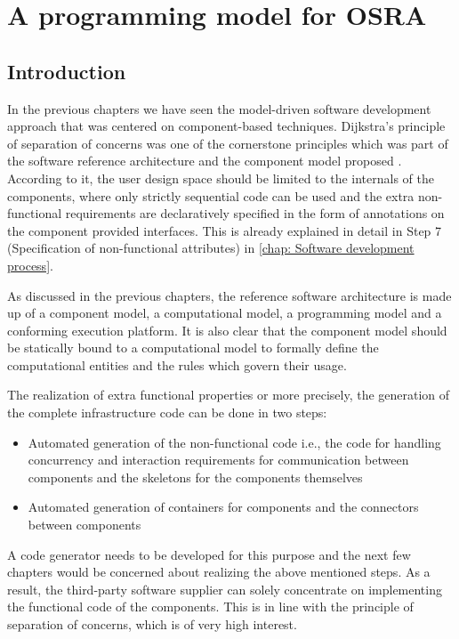 
\chapter{A programming model for OSRA}
\label{chap: Progamming model}

\section{Introduction}
In the previous chapters we have seen the model-driven software development approach that was centered on component-based techniques. Dijkstra's principle of separation of concerns was one of the cornerstone principles which was part of the software reference architecture and the component model proposed \cite{CompBasedProcess}\cite{EvoRAVCodeAr}. According to it, the user design space should be limited to the internals of the components, where only strictly sequential code can be used and the extra non-functional requirements are declaratively specified in the form of annotations on the component provided interfaces. This is already explained in detail in Step 7 (Specification of non-functional attributes) in \cref{chap: Software development process}. 

As discussed in the previous chapters, the reference software architecture is made up of a component model, a computational model, a programming model and a conforming execution platform. It is also clear that the component model should be statically bound to a computational model to formally define the computational entities and the rules which govern their usage.

The realization of extra functional properties or more precisely, the generation of the complete infrastructure code can be done in two steps:
\begin{itemize}
\item Automated generation of the non-functional code i.e., the code for handling concurrency and interaction requirements for communication between components and the skeletons for the components themselves
\item Automated generation of containers for components and the connectors between components 
\end{itemize}

A code generator needs to be developed for this purpose and the next few chapters would be concerned about realizing the above mentioned steps. As a result, the third-party software supplier can solely concentrate on implementing the functional code of the components. This is in line with the principle of separation of concerns, which is of very high interest.

